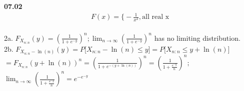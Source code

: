 {\bf 07.02}
\begin{equation*}
\begin{gathered}
	F(x)=\bigg\{ -\frac{1}{x^{2}}, \text{all real x} \\
\end{gathered}
\end{equation*}


2a. $F_{X_{n:n}}(y)= (\frac{1}{1+e^{-y}})^{n} ; \lim _{n\to \infty } 
(\frac{1}{1+e^{-y}})^{n}$ has no limiting distribution. \\

2b. $F_{X_{n:n}-\ln (n)}(y)= P\lbrack X_{n:n}-\ln (n)\le y\rbrack = 
P\lbrack X_{n:n}\le y+\ln (n)\rbrack $\\


$= F_{X_{n:n}} (y+\ln (n))^{n}= (\frac{1}{1+e^{-(y+\ln (n))}})^{n}= 
(\frac{1}{1+\frac{e^{-y}}{n}})^{n};$\\


$\lim _{n\to \infty } (\frac{1}{1+\frac{e^{-y}}{n}})^{n}= e^{-e^{-y}}$
\\
